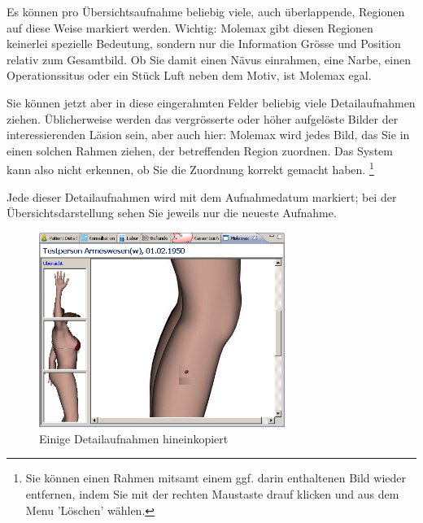 \documentclass[a4paper]{scrartcl}
\begin{document}
Es können pro Übersichtsaufnahme beliebig viele, auch überlappende, Regionen auf diese Weise markiert werden. Wichtig: Molemax gibt diesen Regionen keinerlei spezielle Bedeutung, sondern nur die Information Grösse und Position relativ zum Gesamtbild. Ob Sie damit einen Nävus einrahmen, eine Narbe, einen Operationssitus oder ein Stück Luft neben dem Motiv, ist Molemax egal.

\bigskip

Sie können jetzt aber in diese eingerahmten Felder beliebig viele Detailaufnahmen ziehen. Üblicherweise werden das vergrösserte oder höher aufgelöste Bilder der interessierenden Läsion sein, aber auch hier: Molemax wird jedes Bild, das Sie in einen solchen Rahmen ziehen, der betreffenden Region zuordnen. Das System kann also nicht erkennen, ob Sie die Zuordnung korrekt gemacht haben. \footnote{Sie können einen Rahmen mitsamt einem ggf. darin enthaltenen Bild wieder entfernen, indem Sie mit der rechten Maustaste drauf klicken und aus dem Menu 'Löschen' wählen.}

Jede dieser Detailaufnahmen wird mit dem Aufnahmedatum markiert; bei der Übersichtsdarstellung sehen Sie jeweils nur die neueste Aufnahme.

 \begin{figure}[htp]
     \begin{center}
         \includegraphics[width=8cm]{molemax6}
         \caption{Einige Detailaufnahmen hineinkopiert}
         \label{fig:mole6}
     \end{center}
 \end{figure}

\clearpage
\end{document}
